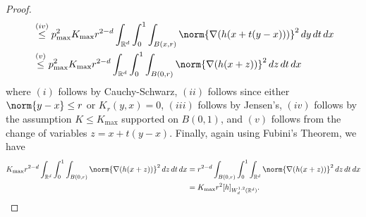 \documentclass{article}
\newcommand{\Reals}{\mathbb{R}}
\newcommand{\1}{\mathbf{1}}
\newcommand{\Rd}{\Reals^d}
\theoremstyle{alden}
\theoremstyle{aldenthm}
\theoremstyle{definition}
\theoremstyle{remark}
\begin{document}
\begin{proof}
\begin{align*}
	& \overset{(iv)}{\leq} p_{\max}^2 K_{\max} r^{2 - d}\int_{\Rd} \int_{0}^{1} \int_{B(x,r)} \norm{\nabla(h(x + t(y - x)))}^2 \,dy \,dt \,dx \\
	& \overset{(v)}{\leq}  p_{\max}^2 K_{\max} r^{2 - d}\int_{\Rd} \int_{0}^{1} \int_{B(0,r)} \norm{\nabla(h(x + z))}^2  \,dz \,dt \,dx
	\end{align*}
	where $(i)$ follows by Cauchy-Schwarz, $(ii)$ follows since either $\norm{y - x} \leq r$ or $K_r(y,x) = 0$, $(iii)$ follows by Jensen's, $(iv)$ follows by the assumption $K \leq K_{\max}$ supported on $B(0,1)$, and $(v)$ follows from the change of variables $z = x + t(y - x)$. Finally, again using Fubini's Theorem, we have
	\begin{align*}
	K_{\max} r^{2 - d}\int_{\Rd} \int_{0}^{1} \int_{B(0,r)} \norm{\nabla(h(x + z))}^2  \,dz \,dt \,dx & = r^{2 - d}\int_{B(0,r)} \int_{0}^{1} \int_{\Rd} \norm{\nabla(h(x + z))}^2  \,dz \,dt \,dx \\
	& = K_{\max} r^2 [h]_{W_d^{1,2}(\Rd)}.
	\end{align*}
\end{proof}
\end{document}
